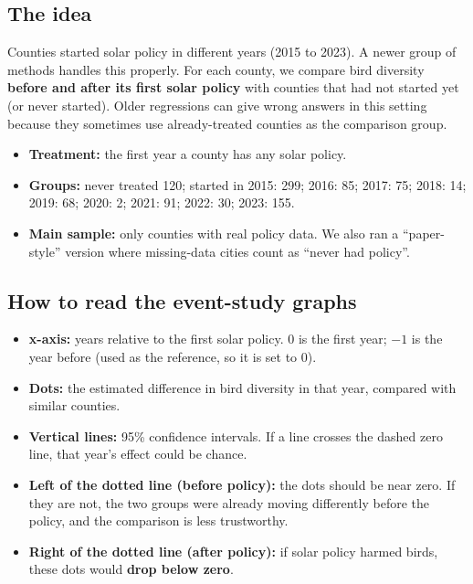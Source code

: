 \documentclass[11pt]{article}
\begin{document}
\subsection{The idea}
Counties started solar policy in different years (2015 to 2023). A newer group of methods handles this properly. For each county, we compare bird diversity \textbf{before and after its first solar policy} with counties that had not started yet (or never started). Older regressions can give wrong answers in this setting because they sometimes use already-treated counties as the comparison group.

\begin{itemize}
\item \textbf{Treatment:} the first year a county has any solar policy.
\item \textbf{Groups:} never treated 120; started in 2015: 299; 2016: 85; 2017: 75; 2018: 14; 2019: 68; 2020: 2; 2021: 91; 2022: 30; 2023: 155.
\item \textbf{Main sample:} only counties with real policy data. We also ran a ``paper-style'' version where missing-data cities count as ``never had policy''.
\end{itemize}

\subsection{How to read the event-study graphs}
\begin{whybox}\small
\begin{itemize}[leftmargin=12pt]
\item \textbf{x-axis:} years relative to the first solar policy. 0 is the first year; $-1$ is the year before (used as the reference, so it is set to 0).
\item \textbf{Dots:} the estimated difference in bird diversity in that year, compared with similar counties.
\item \textbf{Vertical lines:} 95\% confidence intervals. If a line crosses the dashed zero line, that year's effect could be chance.
\item \textbf{Left of the dotted line (before policy):} the dots should be near zero. If they are not, the two groups were already moving differently before the policy, and the comparison is less trustworthy.
\item \textbf{Right of the dotted line (after policy):} if solar policy harmed birds, these dots would \textbf{drop below zero}.
\end{itemize}
\end{whybox}
\end{document}
